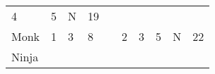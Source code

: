 \documentclass[12pt]{article}
\begin{document}
\begin{longtable}[]{@{}llllllllll@{}}
\begin{minipage}[t]{0.06\columnwidth}
4
\strut\end{minipage} &
\begin{minipage}[t]{0.06\columnwidth}\raggedright\strut
5
\strut\end{minipage} &
\begin{minipage}[t]{0.07\columnwidth}\raggedright\strut
N
\strut\end{minipage} &
\begin{minipage}[t]{0.08\columnwidth}\raggedright\strut
19
\strut\end{minipage}\tabularnewline
\begin{minipage}[t]{0.13\columnwidth}\raggedright\strut
Monk
\strut\end{minipage} &
\begin{minipage}[t]{0.06\columnwidth}\raggedright\strut
1
\strut\end{minipage} &
\begin{minipage}[t]{0.06\columnwidth}\raggedright\strut
3
\strut\end{minipage} &
\begin{minipage}[t]{0.06\columnwidth}\raggedright\strut
8
\strut\end{minipage} &
\begin{minipage}[t]{0.06\columnwidth}\raggedright\strut
\strut\end{minipage} &
\begin{minipage}[t]{0.06\columnwidth}\raggedright\strut
2
\strut\end{minipage} &
\begin{minipage}[t]{0.06\columnwidth}\raggedright\strut
3
\strut\end{minipage} &
\begin{minipage}[t]{0.06\columnwidth}\raggedright\strut
5
\strut\end{minipage} &
\begin{minipage}[t]{0.07\columnwidth}\raggedright\strut
N
\strut\end{minipage} &
\begin{minipage}[t]{0.08\columnwidth}\raggedright\strut
22
\strut\end{minipage}\tabularnewline
\begin{minipage}[t]{0.13\columnwidth}\raggedright\strut
Ninja
\strut\end{minipage} &
\begin{minipage}[t]{0.06\columnwidth}\raggedright\strut
\strut\end{minipage} &
\begin{minipage}[t]{0.06\columnwidth}\raggedright\strut

\end{minipage}
\end{longtable}
\end{document}
